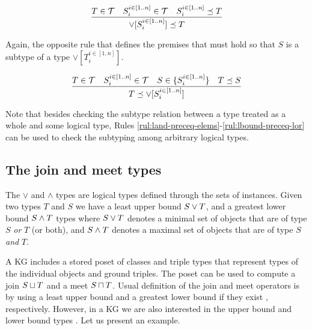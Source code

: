 \documentclass[runningheads]{llncs}
\newcommand{\I}{{\cal I}}
\newcommand{\T}{{\cal T}}
\newcommand{\memo}[1]{}
\begin{document}
\begin{equation}
\label{rul:lor-preceq-ubound}
\dfrac{T\in\T\quad\/S_i^{i\in[1..n]}\in\T\quad\/S_i^{i\in[1..n]}\preceq\/T}
      {\lor[S_i^{i\in[1..n]}]\preceq\/T}  
\end{equation}

Again, the opposite rule that defines the premises that must hold so
that $S$ is a subtype of a type $\lor[T_i^{i\in[1,n]}]$.

\begin{equation}
\label{rul:lbound-preceq-lor}
\dfrac{T\in\T\quad\/S_i^{i\in[1..n]}\in\T\quad\/S\in\{S_i^{i\in[1..n]}\}\quad\/T\preceq\/S}
      {T\preceq\lor[S_i^{i\in[1..n]}]}  
\end{equation}

Note that besides checking the subtype relation between a type treated
as a whole and some logical type, Rules
\ref{rul:land-preceq-elems}-\ref{rul:lbound-preceq-lor} can be used to
check the subtyping among arbitrary logical types.


\memo{
Note that the interpretation of a class $C$ is a set of instances
$\llbracket\/C\rrbracket_\D=\{I\ |\ I\in\I_i\land\/I:C\}$. Further, the
interpretation of a triple type $T$ is the set of ground triples
$\llbracket\/T\rrbracket_\D=\{t\ |\ t\in\T_t\land\/t:T\}$\footnote{Triple
  types $\T_t$ are presented in the following Section
  \ref{sec:triples}.}\cite{Savnik2025}.\\}

\memo{Put together the base types of ground identifiers using $\land$ type.}
\memo{First, the base type of an ground identifier is the $\land$ of all base types.}
\memo{The \emph{base type} of a ground identifier is defined explicitely!}





\subsection{The join and meet types\label{sec:join-meet-types}}

The $\lor$ and $\land$ types are logical types defined through the
sets of instances. Given two types $T$ and $S$ we have a least upper
bound $S\lor\/T$, and a greatest lower bound $S\land\/T$ types where
$S\lor\/T$ denotes a minimal set of objects that are of type $S$
\emph{or} $T$ (or both), and $S\land\/T$ denotes a maximal set of
objects that are of type $S$ \emph{and} $T$.

A KG includes a stored poset of classes and triple types that
represent types of the individual objects and ground triples. The
poset can be used to compute a join $S\sqcup\/T$ and a meet
$S\sqcap\/T$. Usual definition of the join and meet operators is by
using a least upper bound and a greatest lower bound if they exist
\cite{Pierce2002}, respectively. However, in a KG we are also
interested in the upper bound and lower bound types
\cite{DaveyPriestley2002}. Let us present an example.
\end{document}
